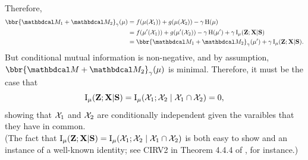 \begin{lproof}
\begin{align*}
    \end{align*}
    Therefore,
    \begin{align*}
        \bbr{\dg M_1 \bundle \dg M_2}_\gamma(\mu)
         &= f(\mu(\X_1)) + g(\mu(\X_2)) - \gamma \H(\mu) \\
         &= f(\mu'(\X_1)) + g(\mu'(\X_2)) - \gamma \H(\mu') + \gamma \I_\mu(\mat Z; \mat X| \mat S) \\
         &= \bbr{\dg M_1 \bundle \dg M_2}_\gamma(\mu') + \gamma \I_\mu(\mat Z; \mat X| \mat S).
    \end{align*}
    But conditional mutual information is non-negative, and by assumption, $\bbr{\dg M \bundle \dg M_2}_\gamma(\mu)$ is minimal. Therefore, it must be the case that
    \[
        \operatorname{\mathrm{I}}_\mu(\mathbf{Z}; \mathbf{X}| \mathbf{S}) = \operatorname{\mathrm{I}}_\mu(\mathcal X_1; \mathcal X_2 \mid \mathcal X_1 \cap \mathcal X_2) = 0,
    \]
    showing that $\mathcal X_1$ and $\mathcal X_2$ are conditionally independent given the varaibles that they have in common. \\
    (The fact that $\operatorname{\mathrm{I}}_\mu(\mathbf{Z}; \mathbf{X}| \mathbf{S}) = \operatorname{\mathrm{I}}_\mu(\mathcal X_1; \mathcal X_2 \mid \mathcal X_1 \cap \mathcal X_2)$ is both easy to show and an instance of a well-known identity; see CIRV2 in Theorem 4.4.4 of \textcite{halpern2017reasoning}, for instance.)
\end{lproof}

